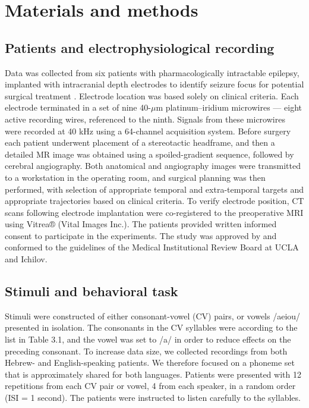 \section{Materials and methods}
\subsection{Patients and electrophysiological recording}
Data was collected from six patients with pharmacologically intractable epilepsy, implanted with intracranial depth electrodes to identify seizure focus for potential surgical treatment \citep{mukamel2012human}. Electrode location was based solely on clinical criteria. Each electrode terminated in a set of nine 40-$\mu$m platinum–iridium microwires \citep{fried1999cerebral} — eight active recording wires, referenced to the ninth. Signals from these microwires were recorded at 40 kHz using a 64-channel acquisition system. Before surgery each patient underwent placement of a stereotactic headframe, and then a detailed MR image was obtained using a spoiled-gradient sequence, followed by cerebral angiography. Both anatomical and angiography images were transmitted to a workstation in the operating room, and surgical planning was then performed, with selection of appropriate temporal and extra-temporal targets and appropriate trajectories based on clinical criteria. To verify electrode position, CT scans following electrode implantation were co-registered to the preoperative MRI using Vitrea® (Vital Images Inc.). The patients provided written informed consent to participate in the experiments. The study was approved by and conformed to the guidelines of the Medical Institutional Review Board at UCLA and Ichilov.

\subsection{Stimuli and behavioral task}
Stimuli were constructed of either consonant-vowel (CV) pairs, or vowels /aeiou/ presented in isolation. The consonants in the CV syllables were according to the list in Table 3.1, and the vowel was set to /a/ in order to reduce effects on the preceding consonant. To increase data size, we collected recordings from both Hebrew- and English-speaking patients. We therefore focused on a phoneme set that is approximately shared for both languages. Patients  were presented with 12 repetitions from each CV pair or vowel, 4 from each speaker, in a random order (ISI = 1 second). The patients were instructed to listen carefully to the syllables.


